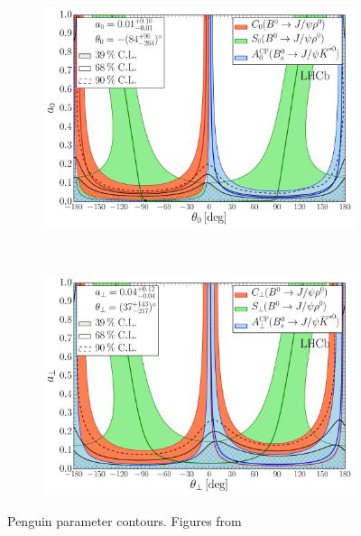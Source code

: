 \begin{figure}[h]
\begin{center}
  \begin{subfigure}{1\textwidth}
    \includegraphics[trim=0.0cm 0.0cm 0.0cm 0.0cm, clip=true,scale=0.4]{Figures/Chapter5/Penguin_Contribution_Ang_vs_Abs_allB2VV_Long.pdf}
    \caption{}
    \label{pengPlot_long}
  \end{subfigure}\\
  \begin{subfigure}{1\textwidth}
    \includegraphics[trim=0.0cm 0.0cm 0.0cm 0.0cm, clip=true,scale=0.4]{Figures/Chapter5/Penguin_Contribution_Ang_vs_Abs_allB2VV_Perp.pdf}
    \caption{}
    \label{pengPlot_perp}
  \end{subfigure}
  \caption{Penguin parameter contours. Figures from~\cite{DeBruyn-thesis}}
\end{center}
\end{figure}

